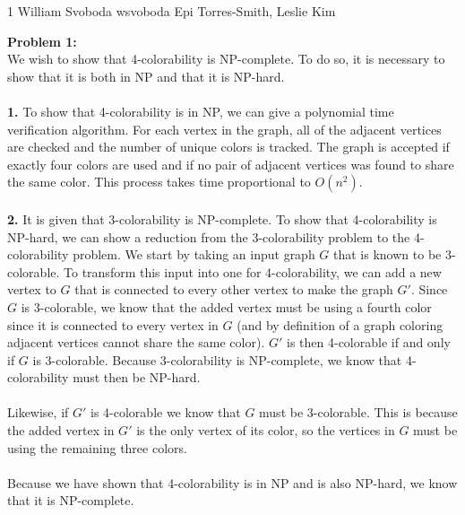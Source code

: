 \documentclass[12pt,letterpaper]{cos340hw}
\begin{document}
           {1}            %
           {William Svoboda}  %
           {wsvoboda}   %
           {Epi Torres-Smith, Leslie Kim} 




\noindent\textbf{Problem 1:}\\
We wish to show that 4-colorability is NP-complete. To do so, it is necessary 
to show that it is both in NP and that it is NP-hard.\\\\
\noindent\textbf{1.} To show that 4-colorability is in NP, we can give a 
polynomial time verification algorithm. For each vertex in the graph, all of the adjacent 
vertices are checked and the number of unique colors is tracked. The graph is accepted if exactly four 
colors are used and if no pair of adjacent vertices was found to share the same color. This process takes 
time proportional to $O(n^2)$.\\\\
\noindent\textbf{2.} It is given that 3-colorability is NP-complete. To show that 4-colorability is NP-hard, 
we can show a reduction from the 3-colorability problem to the 4-colorability problem. We start by taking 
an input graph $G$ that is known to be 3-colorable. To transform this input into one for 4-colorability, we
can add a new vertex to $G$ that is connected to every other vertex to make the graph $G'$. Since $G$ 
is 3-colorable, we know that the added vertex must be using a fourth color since it is connected to every 
vertex in $G$ (and by definition of a graph coloring adjacent vertices cannot share the same color). $G'$ 
is then 4-colorable if and only if $G$ is 3-colorable. Because 3-colorability is NP-complete, we know that 4-colorability 
must then be NP-hard.\\\\
Likewise, if $G'$ is 4-colorable we know that $G$ must be 3-colorable. This is because the added vertex in $G'$
is the only vertex of its color, so the vertices in $G$ must be using the remaining three colors.\\\\
Because we have shown that 4-colorability is in NP and is also NP-hard, we know that it is NP-complete.


\end{document}
